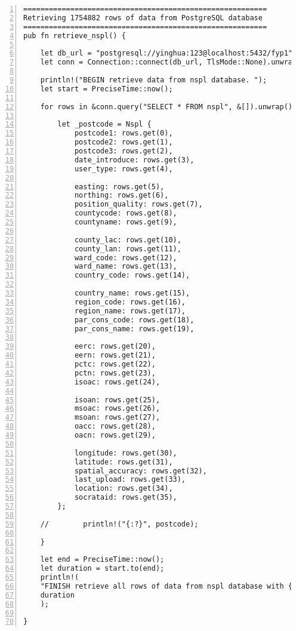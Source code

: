 \lstset{basicstyle=\ttfamily\tiny}  
\begin{lstlisting}[breaklines, frame=single, numbers=left, caption={Function for NSPL data retrieval. (nspl.rs)}, label=commandline-02]
=========================================================
Retrieving 1754882 rows of data from PostgreSQL database 
=========================================================
pub fn retrieve_nspl() {

	let db_url = "postgresql://yinghua:123@localhost:5432/fyp1";
	let conn = Connection::connect(db_url, TlsMode::None).unwrap();
	
	println!("BEGIN retrieve data from nspl database. ");
	let start = PreciseTime::now();
	
	for rows in &conn.query("SELECT * FROM nspl", &[]).unwrap() {
	
		let _postcode = Nspl {
			postcode1: rows.get(0),
			postcode2: rows.get(1),
			postcode3: rows.get(2),
			date_introduce: rows.get(3),
			user_type: rows.get(4),
			
			easting: rows.get(5),
			northing: rows.get(6),
			position_quality: rows.get(7),
			countycode: rows.get(8),
			countyname: rows.get(9),
			
			county_lac: rows.get(10),
			county_lan: rows.get(11),
			ward_code: rows.get(12),
			ward_name: rows.get(13),
			country_code: rows.get(14),
			
			country_name: rows.get(15),
			region_code: rows.get(16),
			region_name: rows.get(17),
			par_cons_code: rows.get(18),
			par_cons_name: rows.get(19),
			
			eerc: rows.get(20),
			eern: rows.get(21),
			pctc: rows.get(22),
			pctn: rows.get(23),
			isoac: rows.get(24),
			
			isoan: rows.get(25),
			msoac: rows.get(26),
			msoan: rows.get(27),
			oacc: rows.get(28),
			oacn: rows.get(29),
			
			longitude: rows.get(30),
			latitude: rows.get(31),
			spatial_accuracy: rows.get(32),
			last_upload: rows.get(33),
			location: rows.get(34),
			socrataid: rows.get(35),
		};
	
	//        println!("{:?}", postcode);
	
	}
	
	let end = PreciseTime::now();
	let duration = start.to(end);
	println!(
	"FINISH retrieve all rows of data from nspl database with {} seconds.",
	duration
	);

}

\end{lstlisting}

